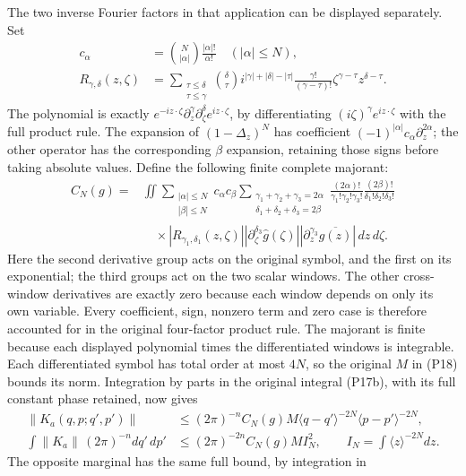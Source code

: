 \documentclass[
  11pt,
]{article}
\begin{document}
The two inverse Fourier factors in that application can be displayed
separately. Set \[
\begin{aligned}
c_\alpha&=\binom N{|\alpha|}\frac{|\alpha|!}{\alpha!}\quad(|\alpha|\le N),\\
R_{\gamma,\delta}(z,\zeta)
 &=\sum_{\substack{\tau\le\delta\\\tau\le\gamma}}
 \binom\delta\tau i^{|\gamma|+|\delta|-|\tau|}
 \frac{\gamma!}{(\gamma-\tau)!}\zeta^{\gamma-\tau}z^{\delta-\tau}.
\end{aligned}
\] The polynomial is exactly
\(e^{-iz\cdot\zeta}\partial_z^\gamma\partial_\zeta^\delta e^{iz\cdot\zeta}\),
by differentiating \((i\zeta)^\gamma e^{iz\cdot\zeta}\) with the full
product rule. The expansion of \((1-\Delta_z)^N\) has coefficient
\((-1)^{|\alpha|}c_\alpha\partial_z^{2\alpha}\); the other operator has
the corresponding \(\beta\) expansion, retaining those signs before
taking absolute values. Define the following finite complete majorant:
\[
\begin{aligned}
C_N(g)={}&\iint\sum_{\substack{|\alpha|\le N\\|\beta|\le N}}c_\alpha c_\beta
 \sum_{\substack{\gamma_1+\gamma_2+\gamma_3=2\alpha\\
                  \delta_1+\delta_2+\delta_3=2\beta}}
 \frac{(2\alpha)!}{\gamma_1!\gamma_2!\gamma_3!}
 \frac{(2\beta)!}{\delta_1!\delta_2!\delta_3!}\\
 &\quad{}\times|R_{\gamma_1,\delta_1}(z,\zeta)|
 |\partial_\zeta^{\delta_3}\widehat g(\zeta)|
 |\partial_z^{\gamma_3}\overline{g(z)}|\,dz\,d\zeta.
\end{aligned}
\] Here the second derivative group acts on the original symbol, and the
first on its exponential; the third groups act on the two scalar
windows. The other cross-window derivatives are exactly zero because
each window depends on only its own variable. Every coefficient, sign,
nonzero term and zero case is therefore accounted for in the original
four-factor product rule. The majorant is finite because each displayed
polynomial times the differentiated windows is integrable. Each
differentiated symbol has total order at most \(4N\), so the original
\(M\) in (P18) bounds its norm. Integration by parts in the original
integral (P17b), with its full constant phase retained, now gives \[
\begin{aligned}
\|K_a(q,p;q',p')\|&\le(2\pi)^{-n}C_N(g)M
       \langle q-q'\rangle^{-2N}\langle p-p'\rangle^{-2N},\\
\int\|K_a\|\,(2\pi)^{-n}dq'\,dp'
 &\le(2\pi)^{-2n}C_N(g)M I_N^2,
 \qquad I_N=\int\langle z\rangle^{-2N}dz.
\end{aligned}
\tag{HM6}
\] The opposite marginal has the same full bound, by integration in
\end{document}
